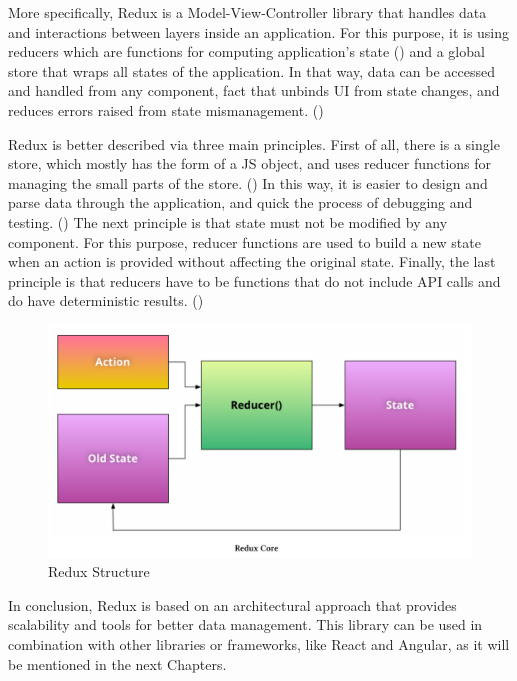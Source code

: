 More specifically, Redux is a Model-View-Controller library that handles data and interactions between layers inside an application. For this purpose, it is using reducers which are functions for computing application's state (\cite{Reference15}) and a global store that wraps all states of the application. In that way, data can be accessed and handled from any component, fact that unbinds UI from state changes, and reduces errors raised from state mismanagement. (\cite{Reference10}) \par

Redux is better described via three main principles. First of all, there is a single store, which mostly has the form of a JS object, and uses reducer functions for managing the small parts of the store. (\cite{Reference13}) In this way, it is easier to design and parse data through the application, and quick the process of debugging and testing. (\cite{Reference17}) The next principle is that state must not be modified by any component. For this purpose, reducer functions are used to build a new state when an action is provided without affecting the original state. Finally, the last principle is that reducers have to be functions that do not include API calls and do have deterministic results. (\cite{Reference13}) \par

\begin{figure}[h!]
	\begin{center}
		\includegraphics[scale=0.35]{images/Redux-Philosophy.png}
	\end{center}
	\caption{Redux Structure}
\end{figure}

In conclusion, Redux is based on an architectural approach that provides scalability and tools for better data management. This library can be used in combination with other libraries or frameworks, like React and Angular, as it will be mentioned in the next Chapters.

